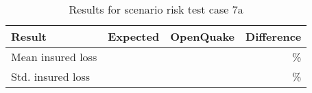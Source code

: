 \begin{table}[htbp]

\centering
\begin{tabular}{ l r r r }

\hline
\rowcolor{anti-flashwhite}
\bf{Result} & \bf{Expected} & \bf{OpenQuake} & \bf{Difference}\\
\hline
Mean insured loss &  &  & \% \\
Std. insured loss &  &  & \% \\
\hline
\end{tabular}

\caption{Results for scenario risk test case 7a}
\label{tab:result-scenario-risk-7a}
\end{table}